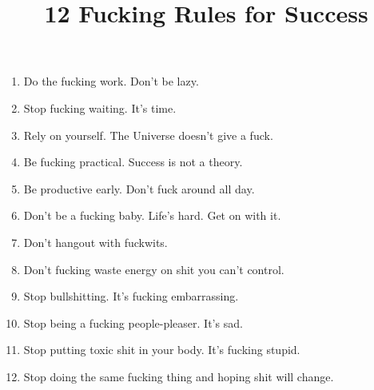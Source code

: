 \documentclass{scrartcl}
\title{12 Fucking Rules for Success}
\begin{document}
\author{}
\date{}
\maketitle
\begin{enumerate}
    \item Do the fucking work. Don't be lazy.
    \item Stop fucking waiting. It's time.
    \item Rely on yourself. The Universe doesn't give a fuck.
    \item Be fucking practical. Success is not a theory.
    \item Be productive early. Don't fuck around all day.
    \item Don't be a fucking baby. Life's hard. Get on with it.
    \item Don't hangout with fuckwits.
    \item Don't fucking waste energy on shit you can't control.
    \item Stop bullshitting. It's fucking embarrassing.
    \item Stop being a fucking people-pleaser. It's sad.
    \item Stop putting toxic shit in your body. It's fucking stupid.
    \item Stop doing the same fucking thing and hoping shit will change.
\end{enumerate}
\end{document}
